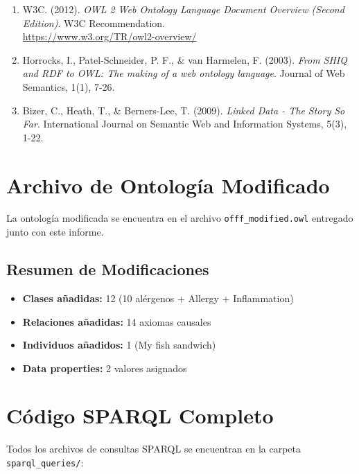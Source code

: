 \documentclass[12pt,a4paper]{article}
\begin{document}
\begin{enumerate}
    \item W3C. (2012). \textit{OWL 2 Web Ontology Language Document Overview (Second Edition)}. W3C Recommendation. \\
    \url{https://www.w3.org/TR/owl2-overview/}
    
    \item Horrocks, I., Patel-Schneider, P. F., \& van Harmelen, F. (2003). \textit{From SHIQ and RDF to OWL: The making of a web ontology language}. Journal of Web Semantics, 1(1), 7-26.
    
    \item Bizer, C., Heath, T., \& Berners-Lee, T. (2009). \textit{Linked Data - The Story So Far}. International Journal on Semantic Web and Information Systems, 5(3), 1-22.
\end{enumerate}

\newpage
\appendix

\section{Archivo de Ontología Modificado}

La ontología modificada se encuentra en el archivo \texttt{offf\_modified.owl} entregado junto con este informe.

\subsection{Resumen de Modificaciones}

\begin{itemize}
    \item \textbf{Clases añadidas:} 12 (10 alérgenos + Allergy + Inflammation)
    \item \textbf{Relaciones añadidas:} 14 axiomas causales
    \item \textbf{Individuos añadidos:} 1 (My fish sandwich)
    \item \textbf{Data properties:} 2 valores asignados
\end{itemize}

\section{Código SPARQL Completo}

Todos los archivos de consultas SPARQL se encuentran en la carpeta \texttt{sparql\_queries/}:
\end{document}
